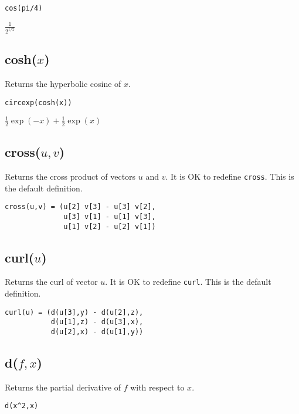 {\color{blue}
\begin{verbatim}
cos(pi/4)
\end{verbatim}
}

\noindent
$\displaystyle \frac{1}{2^{1/2}}$

\subsection*{cosh($x$)}

Returns the hyperbolic cosine of $x$.

{\color{blue}
\begin{verbatim}
circexp(cosh(x))
\end{verbatim}
}

\noindent
$\tfrac{1}{2}\exp(-x)+\tfrac{1}{2}\exp(x)$


\subsection*{cross($u,v$)}

Returns the cross product of vectors $u$ and $v$.
It is OK to redefine \verb$cross$.
This is the default definition.

{\color{blue}
\begin{verbatim}
cross(u,v) = (u[2] v[3] - u[3] v[2],
              u[3] v[1] - u[1] v[3],
              u[1] v[2] - u[2] v[1])
\end{verbatim}
}

\subsection*{curl($u$)}

Returns the curl of vector $u$.
It is OK to redefine {\tt curl}.
This is the default definition.

{\color{blue}
\begin{verbatim}
curl(u) = (d(u[3],y) - d(u[2],z),
           d(u[1],z) - d(u[3],x),
           d(u[2],x) - d(u[1],y))
\end{verbatim}
}

\subsection*{d($f,x$)}

Returns the partial derivative of $f$ with respect to $x$.

{\color{blue}
\begin{verbatim}
d(x^2,x)
\end{verbatim}
}


